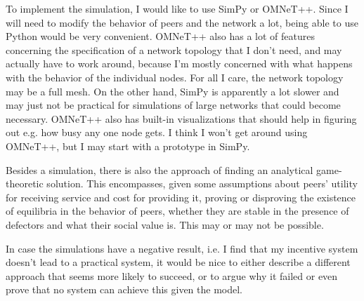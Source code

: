 \documentclass[10pt]{article}
\begin{document}
To implement the simulation, I would like to use SimPy or OMNeT++. Since I will
need to modify the behavior of peers and the network a lot, being able to use
Python would be very convenient. OMNeT++ also has a lot of features concerning
the specification of a network topology that I don't need, and may actually have
to work around, because I'm mostly concerned with what happens with the behavior
of the individual nodes. For all I care, the network topology may be a full
mesh. On the other hand, SimPy is apparently a lot
slower\cite{oujezsky2016case,vom2008comparing} and may just not be practical for
simulations of large networks that could become necessary. OMNeT++ also has
built-in visualizations that should help in figuring out e.g. how busy any one
node gets. I think I won't get around using OMNeT++, but I may start with a
prototype in SimPy.

Besides a simulation, there is also the approach of finding an analytical
game-theoretic solution. This encompasses, given some assumptions about peers'
utility for receiving service and cost for providing it, proving or disproving
the existence of equilibria in the behavior of peers, whether they are stable in
the presence of defectors and what their social value is. This may or may not be
possible.

In case the simulations have a negative result, i.e. I find that my incentive
system doesn't lead to a practical system, it would be nice to either describe a
different approach that seems more likely to succeed, or to argue why it failed
or even prove that no system can achieve this given the model.
\end{document}
